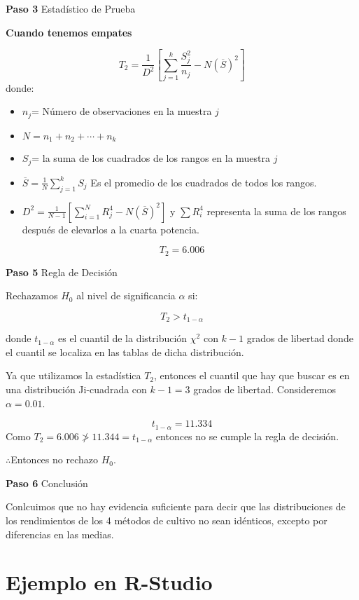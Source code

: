 \documentclass[
  a4paper,
  oneside,
  openany]{book}
\begin{document}
\textbf{Paso 3} Estadístico de Prueba

\textbf{Cuando tenemos empates}

\[T_{2}= \frac{1}{D^2}\left[\sum_{j=1}^{k}\frac{S_{j}^2}{n_j}-N(\overline{S})^2\right]\]
donde:

\begin{itemize}
\item
  \(n_{j}\)= Número de observaciones en la muestra \(j\)
\item
  \(N= n_{1}+n_{2}+\cdots+n_{k}\)
\item
  \(S_{j}\)= la suma de los cuadrados de los rangos en la muestra \(j\)
\item
  \(\overline{S}= \frac{1}{N}\sum_{j=1}^{k}S_{j}\) Es el promedio de los cuadrados de todos los rangos.
\item
  \(D^2=\frac{1}{N-1}\left[\sum_{i=1}^{N}R^4_{j}-N(\overline{S})^2\right]\) y \(\sum{R_{i}^4}\) representa la suma de los rangos después de elevarlos a la cuarta potencia.
\end{itemize}

\[T_{2}=6.006\]

\textbf{Paso 5} Regla de Decisión

Rechazamos \(H_0\) al nivel de significancia \(\alpha\) si:

\[T_{2}>t_{1-\alpha}\]

donde \(t_{1-\alpha}\) es el cuantil de la distribución \(\chi^2\) con \(k-1\) grados de libertad donde el cuantil se localiza en las tablas de dicha distribución.

Ya que utilizamos la estadística \(T_2\), entonces el cuantil que hay que buscar es en una distribución Ji-cuadrada con \(k-1=3\) grados de libertad. Consideremos \(\alpha=0.01\).

\[t_{1-\alpha}=11.334\]
Como \(T_2=6.006 \ngtr 11.344=t_{1-\alpha}\) entonces no se cumple la regla de decisión.

\(\therefore\)Entonces no rechazo \(H_0\).

\textbf{Paso 6} Conclusión

Conlcuimos que no hay evidencia suficiente para decir que las distribuciones de los rendimientos de los 4 métodos de cultivo no sean idénticos, excepto por diferencias en las medias.

\hypertarget{ejemplo-en-r-studio-8}{%
\section{Ejemplo en R-Studio}\label{ejemplo-en-r-studio-8}}
\end{document}
